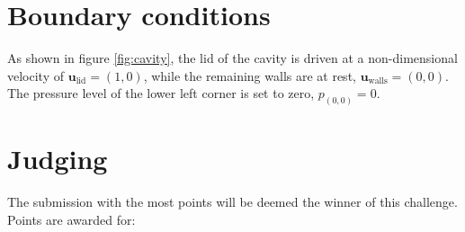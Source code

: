 \documentclass[]{article}
\begin{document}
\section{Boundary conditions}

As shown in figure \ref{fig:cavity}, the lid of the cavity is driven at a non-dimensional velocity of $\mathbf{u}_{\text{lid}} = (1,0)$, while the remaining walls are at rest, $\mathbf{u}_{\text{walls}} = (0,0)$.
The pressure level of the lower left corner is set to zero, $p_{(0,0)}=0$.

\section{Judging}

The submission with the most points will be deemed the winner of this challenge.
Points are awarded for:
\end{document}
